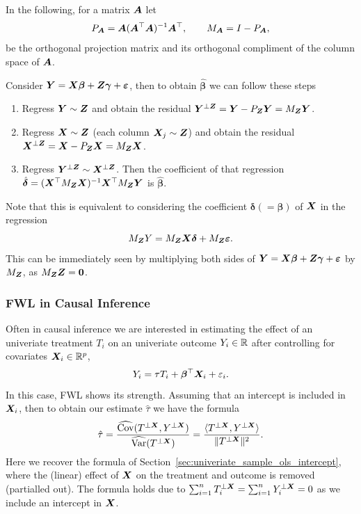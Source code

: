 \documentclass[11pt]{exam}
\begin{document}
In the following, for a matrix $\bm{A}$ let 
\[
    P_{\bm{A}} = \bm{A} (\bm{A}^\top \bm{A})^{-1} \bm{A}^\top, \qquad M_{\bm{A}} = I - P_{\bm{A}},
\]
be the orthogonal projection matrix and its orthogonal compliment of the column space of $\bm{A}$.

\begin{theorem}
Consider $\bm{Y} = \bm{X} \bm{\beta} + \bm{Z} \bm{\gamma} + \bm{\varepsilon}$, then to obtain $\hat{\bm{\beta}}$ we can follow these steps
\begin{enumerate}
    \item Regress $\bm{Y} \sim \bm{Z}$ and obtain the residual $\bm{Y}^{\perp \bm{Z}} = \bm{Y} - P_{\bm{Z}}\bm{Y} = M_{\bm{Z}} \bm{Y}$.
    \item Regress $\bm{X} \sim \bm{Z}$ (each column $\bm{X}_j \sim \bm{Z}$) and obtain the residual $\bm{X}^{\perp \bm{Z}} = \bm{X} - P_{\bm{Z}}\bm{X} = M_{\bm{Z}} \bm{X}$.
    \item Regress $\bm{Y}^{\perp \bm{Z}} \sim \bm{X}^{\perp \bm{Z}}$. Then the coefficient of that regression $\hat{\bm{\delta}} = (\bm{X}^\top M_{\bm{Z}} \bm{X})^{-1} \bm{X}^\top M_{\bm{Z}} \bm{Y}$ is $\hat{\bm{\beta}}$.
\end{enumerate}
\end{theorem}
Note that this is equivalent to considering the coefficient $\bm{\delta} (= \bm{\beta})$ of $\bm{X}$ in the regression
\[
   M_{\bm{Z}} Y = M_{\bm{Z}} \bm{X} \bm{\delta} + M_{\bm{Z}} \bm{\varepsilon}.
\]
This can be immediately seen by multiplying both sides of $\bm{Y} = \bm{X} \bm{\beta} + \bm{Z} \bm{\gamma} + \bm{\varepsilon}$ by $M_{\bm{Z}}$, as $M_{\bm{Z}} \bm{Z} = \bm{0}$.

\subsubsection{FWL in Causal Inference}
Often in causal inference we are interested in estimating the effect of an univeriate treatment $T_i$ on an univeriate outcome $Y_i \in \mathbb{R}$ after controlling for covariates $\bm{X}_i \in \mathbb{R}^p$,
\[
    Y_i = \tau T_i + \bm{\beta}^\top \bm{X}_i + \varepsilon_i.
\]
In this case, FWL shows its strength. Assuming that an intercept is included in $\bm{X}_i$, then to obtain our estimate $\hat \tau$ we have the formula
\[
    \hat \tau = \frac{\widehat{\mathrm{Cov}}(T^{\perp \bm{X}}, Y^{\perp \bm{X}})}{\widehat{\mathrm{Var}}(T^{\perp \bm{X}})} = \frac{\langle T^{\perp \bm{X}},Y^{\perp \bm{X}}\rangle}{\|T^{\perp \bm{X}}\|^2}.
\]
Here we recover the formula of Section~\ref{sec:univeriate_sample_ols_intercept}, where the (linear) effect of $\bm{X}$ on the treatment and outcome is removed (partialled out). The formula holds due to $\sum_{i=1}^n T_i^{\perp \bm{X}} = \sum_{i=1}^n Y_i^{\perp \bm{X}} = 0$ as we include an intercept in $\bm{X}$.
\end{document}
